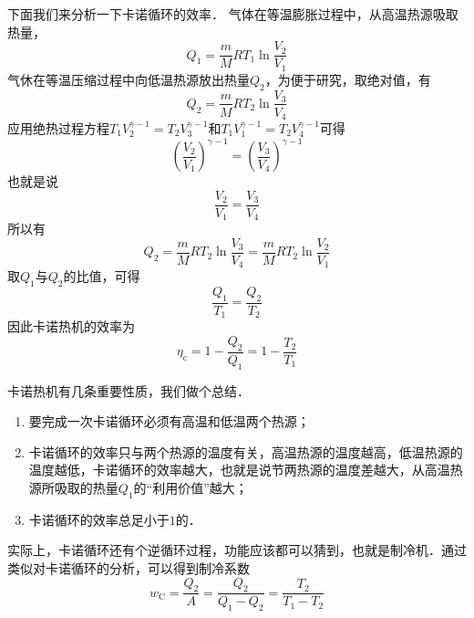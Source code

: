 下面我们来分析一下卡诺循环的效率． 气体在等温膨胀过程中，从高温热源吸取热量，
\begin{equation}
Q_{1}=\frac{m}{M} R T_{1} \ln \frac{V_{2}}{V_{1}}
\end{equation}
气休在等温压缩过程中向低温热源放出热量$Q_2$，为便于研究，取绝对值，有
\begin{equation}
Q_{2}=\frac{m}{M} R T_{2} \ln \frac{V_{3}}{V_{4}}
\end{equation}
应用绝热过程方程$T_{1} V_{2}^{\gamma-1}=T_{2} V_{3}^{\gamma-1}$和$T_{1} V_{1}^{\gamma-1}=T_{2} V_{4}^{\gamma-1}$可得
\begin{equation}
\left(\frac{V_{2}}{V_{1}}\right)^{\gamma-1}=\left(\frac{V_{3}}{V_{4}}\right)^{\gamma-1}
\end{equation}
也就是说
\begin{equation}
\frac{V_{2}}{V_{1}}=\frac{V_{3}}{V_{4}}
\end{equation}
所以有
\begin{equation}
Q_{2}=\frac{m}{M} R T_{2} \ln \frac{V_{3}}{V_{4}}=\frac{m}{M} R T_{2} \ln \frac{V_{2}}{V_{1}}
\end{equation}
取$Q_1$与$Q_2$的比值，可得
\begin{equation}
\frac{Q_{1}}{T_{1}}=\frac{Q_{2}}{T_{2}}
\end{equation}
因此卡诺热机的效率为
\begin{equation}
\eta_{\mathrm{c}}=1-\frac{Q_{2}}{Q_{1}}=1-\frac{T_{2}}{T_{1}}
\end{equation}

卡诺热机有几条重要性质，我们做个总结．

\begin{enumerate}
\item 要完成一次卡诺循环必须有高温和低温两个热源；
\item 卡诺循环的效率只与两个热源的温度有关，高温热源的温度越高，低温热源的温度越低，卡诺循环的效率越大，也就是说节两热源的温度差越大，从高温热源所吸取的热量$Q_1$的“利用价值”越大；
\item 卡诺循环的效率总足小于$1 $的．
\end{enumerate}

实际上，卡诺循环还有个逆循环过程，功能应该都可以猜到，也就是制冷机．通过类似对卡诺循环的分析，可以得到制冷系数
\begin{equation}
w_{\mathrm{C}}=\frac{Q_{2}}{A}=\frac{Q_{2}}{Q_{1}-Q_{2}}=\frac{T_{2}}{T_{1}-T_{2}}
\end{equation}

